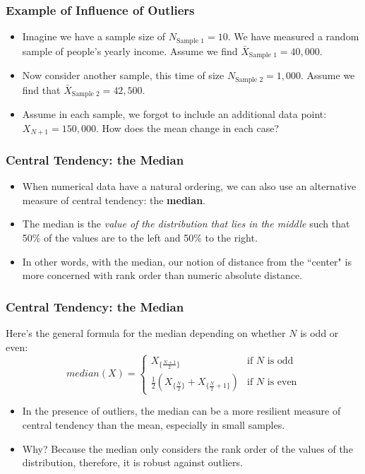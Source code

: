 \documentclass[handout]{beamer} %
\begin{document}
\begin{frame}
\frametitle{Example of Influence of Outliers}
\begin{itemize}
\item Imagine we have a sample size of $N_{\text{Sample 1}}=10$. We have measured a random sample of people’s yearly income. Assume we find $\bar{X}_{\text{Sample 1}} = 40,000$.
\item Now consider another sample, this time of size $N_{\text{Sample 2}} = 1,000$. Assume we find that $\bar{X}_{\text{Sample 2}} = 42,500$.
\item Assume in each sample, we forgot to include an additional data point: $X_{N+1} = 150,000$. How does the mean change in each case?
\end{itemize}
\end{frame}

\begin{frame}
\frametitle{Central Tendency: the Median}
\begin{itemize}
\item When numerical data have a natural ordering, we can also use an alternative measure of central tendency: the \textbf{median}. \pause %
\item The median is the \emph{value of the distribution that lies in the middle} such that 50\% of the values are to the left and 50\% to the right. \pause %
\item In other words, with the median, our notion of distance from the ``center" is more concerned with rank order than numeric absolute distance.
\end{itemize}
\end{frame}

\begin{frame}
\frametitle{Central Tendency: the Median}

Here’s the general formula for the median depending on whether $N$ is odd or even:
\begin{equation*}
median(X) =
\begin{cases}
X_{\{\frac{N+1}{2}\}} & \text{if $N$ is odd} \\
\frac{1}{2}(X_{\{\frac{N}{2}\}} + X_{\{\frac{N}{2} + 1\}}) & \text{if $N$ is even}
\end{cases}
\end{equation*}


\begin{itemize}
\item In the presence of outliers, the median can be a more resilient measure of central tendency than the mean, especially in small samples.
\item Why? Because the median only considers the rank order of the values of the distribution, therefore, it is robust against outliers.
\end{itemize}

\end{frame}
\end{document}
